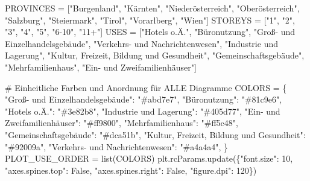 \documentclass[
  ngerman,
  a4paper,
  DIV=11]{scrreprt}
\newenvironment{Shaded}{\begin{snugshade}}{\end{snugshade}}
\newcommand{\BuiltInTok}[1]{\textcolor[rgb]{0.00,0.23,0.31}{#1}}
\newcommand{\CommentTok}[1]{\textcolor[rgb]{0.37,0.37,0.37}{#1}}
\newcommand{\DecValTok}[1]{\textcolor[rgb]{0.68,0.00,0.00}{#1}}
\newcommand{\NormalTok}[1]{\textcolor[rgb]{0.00,0.23,0.31}{#1}}
\newcommand{\OperatorTok}[1]{\textcolor[rgb]{0.37,0.37,0.37}{#1}}
\newcommand{\StringTok}[1]{\textcolor[rgb]{0.13,0.47,0.30}{#1}}
\newcommand{\VariableTok}[1]{\textcolor[rgb]{0.07,0.07,0.07}{#1}}
\begin{document}
\begin{Shaded}
\begin{Highlighting}[]
\NormalTok{PROVINCES }\OperatorTok{=}\NormalTok{ [}\StringTok{"Burgenland"}\NormalTok{, }\StringTok{"Kärnten"}\NormalTok{, }\StringTok{"Niederösterreich"}\NormalTok{, }\StringTok{"Oberösterreich"}\NormalTok{,}
             \StringTok{"Salzburg"}\NormalTok{, }\StringTok{"Steiermark"}\NormalTok{, }\StringTok{"Tirol"}\NormalTok{, }\StringTok{"Vorarlberg"}\NormalTok{, }\StringTok{"Wien"}\NormalTok{]}
\NormalTok{STOREYS }\OperatorTok{=}\NormalTok{ [}\StringTok{"1"}\NormalTok{, }\StringTok{"2"}\NormalTok{, }\StringTok{"3"}\NormalTok{, }\StringTok{"4"}\NormalTok{, }\StringTok{"5"}\NormalTok{, }\StringTok{"6{-}10"}\NormalTok{, }\StringTok{"11+"}\NormalTok{]}
\NormalTok{USES }\OperatorTok{=}\NormalTok{ [}\StringTok{"Hotels o.Ä."}\NormalTok{, }\StringTok{"Büronutzung"}\NormalTok{, }\StringTok{"Groß{-} und Einzelhandelsgebäude"}\NormalTok{,}
        \StringTok{"Verkehrs{-} und Nachrichtenwesen"}\NormalTok{, }\StringTok{"Industrie und Lagerung"}\NormalTok{,}
        \StringTok{"Kultur, Freizeit, Bildung und Gesundheit"}\NormalTok{, }\StringTok{"Gemeinschaftsgebäude"}\NormalTok{,}
        \StringTok{"Mehrfamilienhaus"}\NormalTok{, }\StringTok{"Ein{-} und Zweifamilienhäuser"}\NormalTok{]}

\CommentTok{\# Einheitliche Farben und Anordnung für ALLE Diagramme}
\NormalTok{COLORS }\OperatorTok{=}\NormalTok{ \{}
    \StringTok{"Groß{-} und Einzelhandelsgebäude"}\NormalTok{: }\StringTok{"\#abd7e7"}\NormalTok{,}
    \StringTok{"Büronutzung"}\NormalTok{: }\StringTok{"\#81c9e6"}\NormalTok{,}
    \StringTok{"Hotels o.Ä."}\NormalTok{: }\StringTok{"\#3e82b8"}\NormalTok{,}
    \StringTok{"Industrie und Lagerung"}\NormalTok{: }\StringTok{"\#405d77"}\NormalTok{,}
    \StringTok{"Ein{-} und Zweifamilienhäuser"}\NormalTok{: }\StringTok{"\#ff9800"}\NormalTok{,}
    \StringTok{"Mehrfamilienhaus"}\NormalTok{: }\StringTok{"\#ff5c48"}\NormalTok{,}
    \StringTok{"Gemeinschaftsgebäude"}\NormalTok{: }\StringTok{"\#dca51b"}\NormalTok{,}
    \StringTok{"Kultur, Freizeit, Bildung und Gesundheit"}\NormalTok{: }\StringTok{"\#92009a"}\NormalTok{,}
    \StringTok{"Verkehrs{-} und Nachrichtenwesen"}\NormalTok{: }\StringTok{"\#a4a4a4"}\NormalTok{,}
\NormalTok{\}}
\NormalTok{PLOT\_USE\_ORDER }\OperatorTok{=} \BuiltInTok{list}\NormalTok{(COLORS)}
\NormalTok{plt.rcParams.update(\{}\StringTok{"font.size"}\NormalTok{: }\DecValTok{10}\NormalTok{, }\StringTok{"axes.spines.top"}\NormalTok{: }\VariableTok{False}\NormalTok{,}
                     \StringTok{"axes.spines.right"}\NormalTok{: }\VariableTok{False}\NormalTok{, }\StringTok{"figure.dpi"}\NormalTok{: }\DecValTok{120}\NormalTok{\})}


\end{Highlighting}
\end{Shaded}
\end{document}
